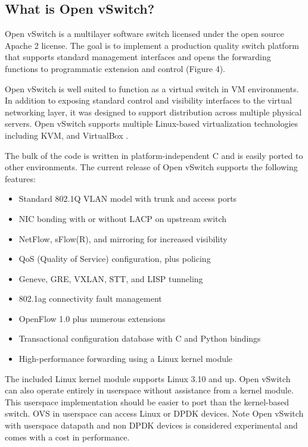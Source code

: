 \documentclass[../sn.tex]{subfiles}
\begin{document}
\subsection{What is Open vSwitch?}
Open vSwitch is a multilayer software switch licensed under the open source Apache 2 license. 
The goal is to implement a production quality switch platform that supports standard management interfaces and opens the forwarding functions to programmatic extension and control (Figure 4).

Open vSwitch is well suited to function as a virtual switch in VM environments. 
In addition to exposing standard control and visibility interfaces to the virtual networking layer, it was designed to support distribution across multiple physical servers. 
Open vSwitch supports multiple Linux-based virtualization technologies including KVM, and VirtualBox \cite{ovs}.

The bulk of the code is written in platform-independent C and is easily ported to other environments. The current release of Open vSwitch supports the following features:
\begin{itemize}
    \item Standard 802.1Q VLAN model with trunk and access ports
    \item NIC bonding with or without LACP on upstream switch
    \item NetFlow, sFlow(R), and mirroring for increased visibility
    \item QoS (Quality of Service) configuration, plus policing
    \item Geneve, GRE, VXLAN, STT, and LISP tunneling
    \item 802.1ag connectivity fault management
    \item OpenFlow 1.0 plus numerous extensions
    \item Transactional configuration database with C and Python bindings
    \item High-performance forwarding using a Linux kernel module
\end{itemize} The included Linux kernel module supports Linux 3.10 and up.
Open vSwitch can also operate entirely in userspace without assistance from a kernel module. 
This userspace implementation should be easier to port than the kernel-based switch.
OVS in userspace can access Linux or DPDK devices. Note Open vSwitch with userspace datapath and non DPDK devices is considered experimental and comes with a cost in performance.
\end{document}
